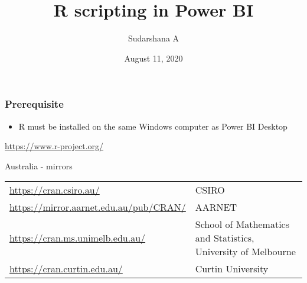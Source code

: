 \documentclass[
]{article}
\title{R scripting in Power BI}
\author{Sudarshana A}
\date{August 11, 2020}
\providecommand{\tightlist}{%
  \setlength{\itemsep}{0pt}\setlength{\parskip}{0pt}}
\begin{document}
\maketitle

{
\setcounter{tocdepth}{2}
\tableofcontents
}
\hypertarget{prerequisite}{%
\subsubsection{Prerequisite}\label{prerequisite}}

\begin{itemize}
\tightlist
\item
  R must be installed on the same Windows computer as Power BI Desktop
\end{itemize}

\url{https://www.r-project.org/}

Australia - mirrors

\begin{longtable}[]{@{}ll@{}}
\toprule
\endhead
\begin{minipage}[t]{0.47\columnwidth}\raggedright
\url{https://cran.csiro.au/}\strut
\end{minipage} & \begin{minipage}[t]{0.47\columnwidth}\raggedright
CSIRO\strut
\end{minipage}\tabularnewline
\begin{minipage}[t]{0.47\columnwidth}\raggedright
\url{https://mirror.aarnet.edu.au/pub/CRAN/}\strut
\end{minipage} & \begin{minipage}[t]{0.47\columnwidth}\raggedright
AARNET\strut
\end{minipage}\tabularnewline
\begin{minipage}[t]{0.47\columnwidth}\raggedright
\url{https://cran.ms.unimelb.edu.au/}\strut
\end{minipage} & \begin{minipage}[t]{0.47\columnwidth}\raggedright
School of Mathematics and Statistics, University of Melbourne\strut
\end{minipage}\tabularnewline
\begin{minipage}[t]{0.47\columnwidth}\raggedright
\url{https://cran.curtin.edu.au/}\strut
\end{minipage} & \begin{minipage}[t]{0.47\columnwidth}\raggedright
Curtin University\strut
\end{minipage}\tabularnewline
\bottomrule
\end{longtable}
\end{document}
